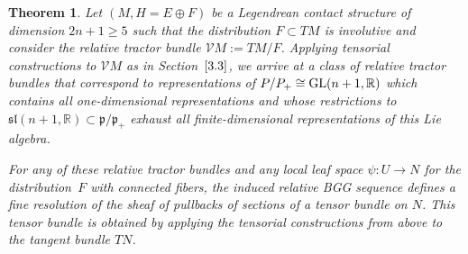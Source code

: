 \documentclass[pdftex]{sigma}
\numberwithin{equation}{section}
\newtheorem{Theorem}{Theorem}[section]
\def\frak{\mathfrak}
\def\Bbb{\mathbb}
\def\Cal{\mathcal}
\begin{document}
\begin{Theorem}\label{thm3.4}
 Let $(M,H=E\oplus F)$ be a Legendrean contact structure of dimension ${2n+1\geq 5}$
 such that the distribution $F\subset TM$ is involutive and consider the relative
 tractor bundle $\Cal VM:=TM/F$. Applying tensorial constructions to $\Cal VM$ as in
 Section~$\ref{3.3}$, we arrive at a class of relative tractor bundles that correspond to
 representations of $P/P_+\cong {\rm GL}(n+1,\Bbb R)$ which contains all one-dimensional
 representations and whose restrictions to
 $\frak{sl}(n+1,\Bbb R)\subset\frak p/\frak p_+$ exhaust all finite-dimensional
 representations of this Lie algebra.

 For any of these relative tractor bundles and any local leaf space $\psi\colon U\to N$
 for the distribution~$F$ with connected fibers, the induced relative BGG sequence
 defines a fine resolution of the sheaf of pullbacks of sections of a tensor bundle
 on $N$. This tensor bundle is obtained by applying the tensorial constructions from
 above to the tangent bundle $TN$.
\end{Theorem}
\end{document}

